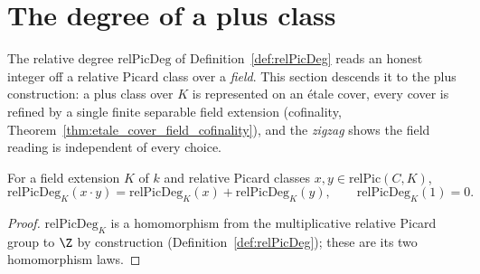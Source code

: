 \section{The degree of a plus class}
\label{sec:degAff}

The relative degree \(\mathrm{relPicDeg}\) of Definition~\ref{def:relPicDeg} reads an honest
integer off a relative Picard class over a \emph{field}. This section descends it to the plus
construction: a plus class over \(K\) is represented on an \'etale cover, every cover is
refined by a single finite separable field extension (cofinality,
Theorem~\ref{thm:etale_cover_field_cofinality}), and the \emph{zigzag} shows the field
reading is independent of every choice.

\begin{lemma}
  \label{lem:relPicDeg_hom}
  \leanok
  For a field extension \(K\) of \(k\) and relative Picard classes
  \(x, y \in \mathrm{relPic}(C, K)\),
  \[
    \mathrm{relPicDeg}_K(x \cdot y) = \mathrm{relPicDeg}_K(x) + \mathrm{relPicDeg}_K(y),
    \qquad \mathrm{relPicDeg}_K(1) = 0 .
  \]
\end{lemma}
\begin{proof}
  \leanok
  \(\mathrm{relPicDeg}_K\) is a homomorphism from the multiplicative relative Picard group to
  \(\Z\) by construction (Definition~\ref{def:relPicDeg}); these are its two homomorphism
  laws.
\end{proof}

